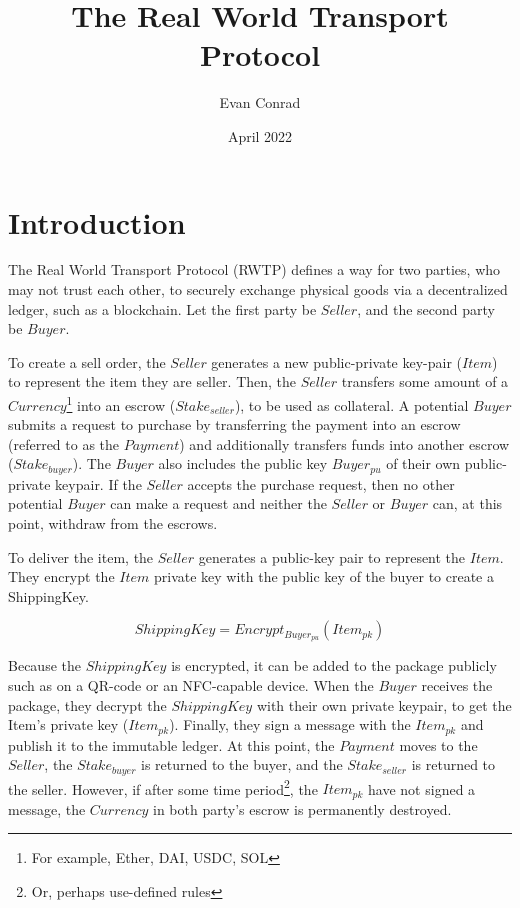 \documentclass{article}
\title{The Real World Transport Protocol}
\author{Evan Conrad}
\date{April 2022}
\begin{document}
\maketitle

\section{Introduction}

The Real World Transport Protocol (RWTP) defines a way for two parties, who may not trust each other, to securely exchange physical goods via a decentralized ledger, such as a blockchain. Let the first party be $Seller$, and the second party be $Buyer$. 

To create a sell order, the $Seller$ generates a new public-private key-pair ($Item$) to represent the item they are seller. Then, the $Seller$ transfers some amount of a $Currency$\footnote{For example, Ether, DAI, USDC, SOL} into an escrow ($Stake_{seller}$), to be used as collateral. A potential $Buyer$ submits a request to purchase by transferring the payment into an escrow (referred to as the $Payment$) and additionally transfers funds into another escrow ($Stake_{buyer}$). The $Buyer$ also includes the public key $Buyer_{pu}$ of their own public-private keypair. If the $Seller$ accepts the purchase request, then no other potential $Buyer$ can make a request and neither the $Seller$ or $Buyer$ can, at this point, withdraw from the escrows. 

To deliver the item, the $Seller$ generates a public-key pair to represent the $Item$. They encrypt the $Item$ private key with the public key of the buyer to create a ShippingKey.

\begin{equation}
    ShippingKey = Encrypt_{Buyer_{pu}}(Item_{pk})
\end{equation} 

Because the $ShippingKey$ is encrypted, it can be added to the package publicly such as on a QR-code or an NFC-capable device. When the $Buyer$ receives the package, they decrypt the $ShippingKey$ with their own private keypair, to get the Item's private key ($Item_{pk}$). Finally, they sign a message with the $Item_{pk}$ and publish it to the immutable ledger. At this point, the $Payment$ moves to the $Seller$, the $Stake_{buyer}$ is returned to the buyer, and the $Stake_{seller}$ is returned to the seller. However, if after some time period\footnote{Or, perhaps use-defined rules}, the $Item_{pk}$ have not signed a message, the $Currency$ in both party's escrow is permanently destroyed.
\end{document}
